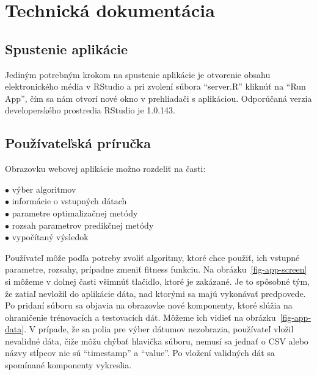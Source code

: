 \documentclass[a4paper,slovak,12pt,appendix]{article}
\begin{document}

\newpage
\appendix
\section{Technická dokumentácia}
\label{documentation}

\subsection{Spustenie aplikácie}
Jediným potrebným krokom na spustenie aplikácie je otvorenie obsahu
elektronického média v RStudio a pri zvolení súbora ``server.R'' kliknúť na
``Run App'', čím sa nám otvorí nové okno v prehliadači s aplikáciou. Odporúčaná
verzia developerského prostredia RStudio je 1.0.143.

\subsection{Používateľská príručka}
Obrazovku webovej aplikácie možno rozdeliť na časti:
\begin{description}
  \item[$\bullet$ výber algoritmov]
  \item[$\bullet$ informácie o vstupných dátach]
  \item[$\bullet$ parametre optimalizačnej metódy]
  \item[$\bullet$ rozsah parametrov predikčnej metódy]
  \item[$\bullet$ vypočítaný výsledok]
\end{description}
Používateľ môže podľa potreby zvoliť algoritmy, ktoré chce použiť, ich vstupné
parametre, rozsahy, prípadne zmeniť fitness funkciu. Na obrázku~\ref{fig-app-screen}
si môžeme v dolnej časti všimnúť tlačidlo, ktoré je zakázané. Je to spôsobné
tým, že zatiaľ nevložil do aplikácie dáta, nad ktorými sa majú vykonávať
predpovede. Po pridaní súboru sa objavia na obrazovke nové komponenty, ktoré
slúžia na ohraničenie trénovacích a testovacích dát. Môžeme ich vidieť na
obrázku~\ref{fig-app-data}. V prípade, že sa polia pre výber dátumov nezobrazia,
používateľ vložil nevalidné dáta, čiže môžu chýbať hlavička súboru, nemusí sa
jednať o CSV alebo názvy stĺpcov nie sú ``timestamp'' a ``value''. Po vložení
validných dát sa spomínané komponenty vykreslia.
\end{document}
